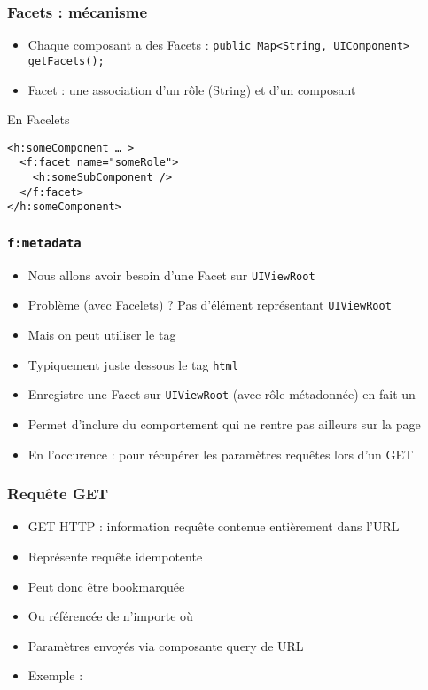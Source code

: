 \documentclass[english, french]{beamer}
\begin{document}
\begin{frame}[fragile]
	\frametitle{Facets : mécanisme}
	\begin{itemize}
		\item Chaque composant a des Facets : \texttt{public Map<String, UIComponent> getFacets();}
		\item Facet : une association d’un rôle (String) et d’un composant
	\end{itemize}
	\begin{block}{En Facelets}
		\begin{lstlisting}
<h:someComponent … >
  <f:facet name="someRole">
    <h:someSubComponent />
  </f:facet>
</h:someComponent>
		\end{lstlisting}
	\end{block}
\end{frame}

\begin{frame}
	\frametitle{\texttt{f:metadata}}
	\begin{itemize}
		\item Nous allons avoir besoin d’une Facet sur \texttt{UIViewRoot}
		\item Problème (avec Facelets) ? \pause Pas d’élément représentant \texttt{UIViewRoot} \pause
		\item Mais on peut utiliser le tag 
		\item {\tiny Typiquement} juste dessous le tag \texttt{html}
		\item Enregistre une Facet sur \texttt{UIViewRoot} (avec rôle métadonnée) {\tiny en fait un }
		\item Permet d’inclure du comportement qui ne rentre pas ailleurs sur la page
		\item En l’occurence : pour récupérer les paramètres requêtes lors d’un GET
	\end{itemize}
\end{frame}

\begin{frame}
	\frametitle{Requête GET}
	\begin{itemize}
		\item GET HTTP : information requête contenue entièrement dans l’URL
		\item Représente requête idempotente
		\item Peut donc être \og{}bookmarquée\fg{}
		\item Ou référencée de n’importe où
		\item Paramètres envoyés via composante \og{}query\fg{} de URL
		\item Exemple : 
	\end{itemize}
\end{frame}
\end{document}
